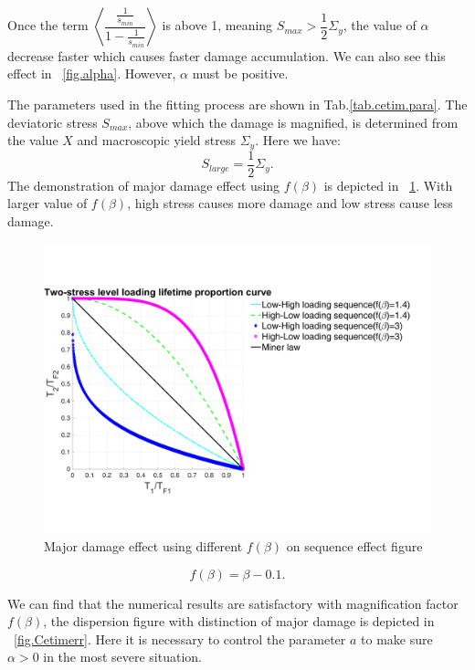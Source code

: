 \documentclass[3p,times,number,review]{elsarticle}
\newcommand{\figref}[1]{\figurename~\ref{#1}}
\begin{document}
Once the term $\left\langle \dfrac{\frac{1}{s_{min}}}{1-\frac{1}{s_{min}}} \right\rangle$ is above 1, meaning $S_{max}>\dfrac{1}{2}\Sigma_y$,  the value of $\alpha$ decrease faster which causes faster damage accumulation. We can also see this effect in \figref{fig.alpha}. However, $\alpha$ must be positive.

The parameters used in the fitting process are shown in Tab.\ref{tab.cetim.para}. 
The deviatoric stress $S_{max}$, above which the damage is magnified,  is determined from the value $X$ and macroscopic yield stress $\Sigma_y$. Here we have:
$$S_{large}=\dfrac{1}{2}\Sigma_y.$$ 
 The demonstration of major damage effect using  $f(\beta)$ is depicted in \figref{fig.sequenceours}. With larger value of $f(\beta)$, high stress causes more damage and low stress cause less damage.
\begin{figure}[!h]
	\centering
	\includegraphics[width=\textwidth]{figures//sequence_ours.png} 
	\caption{Major damage effect using different $f(\beta)$ on sequence effect figure}
	\label{fig.sequenceours}
\end{figure}
$$f(\beta)=\beta-0.1.$$

 We can find that the numerical results are satisfactory with magnification factor $f(\beta)$, the dispersion figure with distinction of major damage is depicted in \figref{fig.Cetimerr}. Here it is necessary to control the parameter $a$ to make sure $\alpha>0$ in the most severe situation.
\end{document}
